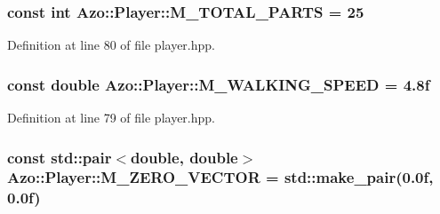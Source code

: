 \subsubsection[{\texorpdfstring{M\+\_\+\+T\+O\+T\+A\+L\+\_\+\+P\+A\+R\+TS}{M_TOTAL_PARTS}}]{\setlength{\rightskip}{0pt plus 5cm}const int Azo\+::\+Player\+::\+M\+\_\+\+T\+O\+T\+A\+L\+\_\+\+P\+A\+R\+TS = 25}\hypertarget{class_azo_1_1_player_a4cd316a415fb0af5d4179a6cd32a2ab2}{}\label{class_azo_1_1_player_a4cd316a415fb0af5d4179a6cd32a2ab2}


Definition at line 80 of file player.\+hpp.

\subsubsection[{\texorpdfstring{M\+\_\+\+W\+A\+L\+K\+I\+N\+G\+\_\+\+S\+P\+E\+ED}{M_WALKING_SPEED}}]{\setlength{\rightskip}{0pt plus 5cm}const double Azo\+::\+Player\+::\+M\+\_\+\+W\+A\+L\+K\+I\+N\+G\+\_\+\+S\+P\+E\+ED = 4.\+8f}\hypertarget{class_azo_1_1_player_a597ac6977889f5bef7f95aaf13ff3f85}{}\label{class_azo_1_1_player_a597ac6977889f5bef7f95aaf13ff3f85}


Definition at line 79 of file player.\+hpp.

\subsubsection[{\texorpdfstring{M\+\_\+\+Z\+E\+R\+O\+\_\+\+V\+E\+C\+T\+OR}{M_ZERO_VECTOR}}]{\setlength{\rightskip}{0pt plus 5cm}const std\+::pair$<$double, double$>$ Azo\+::\+Player\+::\+M\+\_\+\+Z\+E\+R\+O\+\_\+\+V\+E\+C\+T\+OR = std\+::make\+\_\+pair(0.\+0f, 0.\+0f)}\hypertarget{class_azo_1_1_player_a7c56f1e510b86c4719bef956b69befa4}{}\label{class_azo_1_1_player_a7c56f1e510b86c4719bef956b69befa4}



